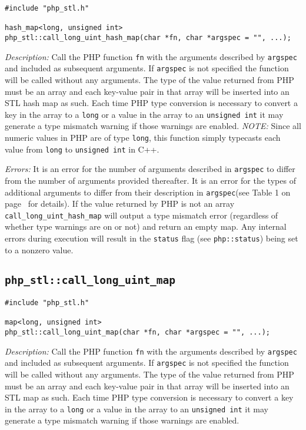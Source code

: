 \documentclass[11pt,titlepage]{article}
\begin{document}
\begin{verbatim}
#include "php_stl.h"

hash_map<long, unsigned int>
php_stl::call_long_uint_hash_map(char *fn, char *argspec = "", ...);
\end{verbatim}

\emph{Description:} Call the PHP function \verb|fn| with the arguments described by \verb|argspec| and included as subsequent arguments. If \verb|argspec| is not specified the function will be called without any arguments. The type of the value returned from PHP must be an array and each key-value pair in that array will be inserted into an STL hash map as such. Each time PHP type conversion is necessary to convert a key in the array to a \verb|long| or a value in the array to an \verb|unsigned int| it may generate a type mismatch warning if those warnings are enabled. \emph{NOTE:} Since all numeric values in PHP are of type \verb|long|, this function simply typecasts each value from \verb|long| to \verb|unsigned int| in C++.

\emph{Errors:} It is an error for the number of arguments described in \verb|argspec| to differ from the number of arguments provided thereafter. It is an error for the types of additional arguments to differ from their description in \verb|argspec|(see Table 1 on page~\pageref{Table1} for details). If the value returned by PHP is not an array \verb|call_long_uint_hash_map| will output a type mismatch error (regardless of whether type warnings are on or not) and return an empty map. Any internal errors during execution will result in the \verb|status| flag (see \verb|php::status|) being set to a nonzero value.


\subsection{\texttt{php\_stl::call\_long\_uint\_map}}

\begin{verbatim}
#include "php_stl.h"

map<long, unsigned int> 
php_stl::call_long_uint_map(char *fn, char *argspec = "", ...);
\end{verbatim}

\emph{Description:} Call the PHP function \verb|fn| with the arguments described by \verb|argspec| and included as subsequent arguments. If \verb|argspec| is not specified the function will be called without any arguments. The type of the value returned from PHP must be an array and each key-value pair in that array will be inserted into an STL map as such. Each time PHP type conversion is necessary to convert a key in the array to a \verb|long| or a value in the array to an \verb|unsigned int| it may generate a type mismatch warning if those warnings are enabled.
\end{document}
